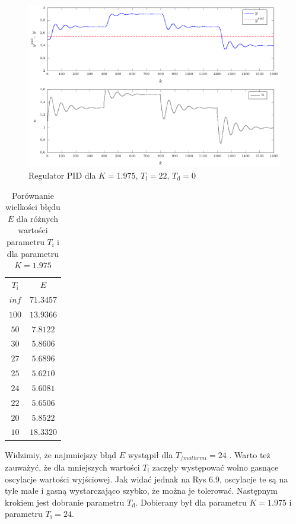 \begin{figure}[tb] 
\centering 
\includegraphics[scale=1]{rysunki/zapisz_pdf/PID_K=1.975_Ti=22.00_Td=0.00.pdf} 
\caption{Regulator PID dla $K=\num{1.975}$, $T_{\mathrm{i}}=22$, $T_{\mathrm{d}}=0$} 
\label{r_pgfplots_PID_K=1.975_Ti=22.00_Td=0.00} 
\end{figure}


\begin{table}
	[b] \caption{Porównanie wielkości błędu $E$ dla różnych wartości parametru $T_{\mathrm{i}}$ i dla parametru $K=\num{1.975}$}
	\label{t_T_i}
	\centering
	\begin{small}
		\begin{tabular}{|c|c|}
			\hline
			$T_{\mathrm{i}}$	&	$E$	\\
			$inf$	&	$\num{71.3457}$		\\
			$100$ 	&	$\num{13.9366}$		\\
			$50$	&	$\num{7.8122}$		\\
			$30$	&	$\num{5.8606}$		\\
			$27$	&	$\num{5.6896}$		\\
			$25$	&	$\num{5.6210}$		\\
			$24$	&	$\num{5.6081}$		\\
			$22$	&	$\num{5.6506}$		\\
			$20$	&	$\num{5,8522}$		\\
			$10$	&	$\num{18.3320}$		\\
			\hline
			\end{tabular}
	\end{small}
\end{table}

Widzimiy, że najmniejszy błąd $E$ wystąpił dla $T_{/mathrm{i}}=24$ . Warto też zauważyć, że dla mniejszych wartości $T_{\mathrm{i}}$ zaczęły występować wolno gasnące oscylacje wartości wyjściowej. Jak widać jednak na Rys 6.9, oscylacje te są na tyle małe i gasną wystarczająco szybko, że można je tolerować. Następnym krokiem jest dobranie parametru $T_{\mathrm{d}}$. Dobierany był dla parametru $K=\num{1.975}$ i parametru $T_{\mathrm{i}}=24$.


